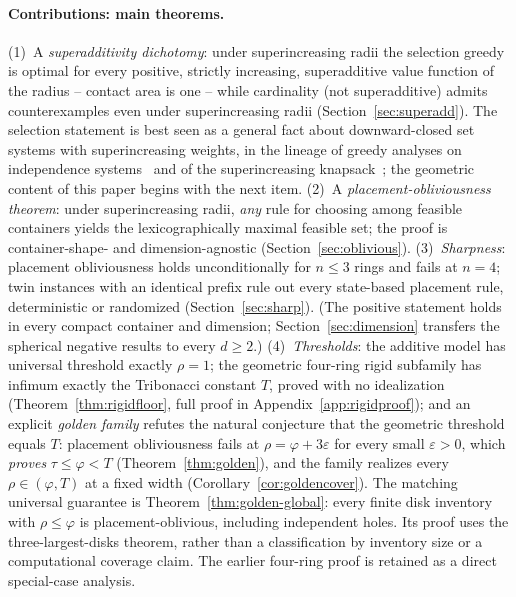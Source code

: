 \documentclass[11pt]{article}
\theoremstyle{definition}
\begin{document}
\paragraph{Contributions: main theorems.}
(1)~A \emph{superadditivity dichotomy}: under superincreasing radii the
selection greedy is optimal for every positive, strictly increasing,
superadditive value function of the radius -- contact area is one -- while
cardinality (not superadditive) admits counterexamples even under
superincreasing radii (Section~\ref{sec:superadd}). The selection statement
is best seen as a general fact about downward-closed set systems with
superincreasing weights, in the lineage of greedy analyses on independence
systems~\cite{Edmonds1971,KorteHausmann1978} and of the superincreasing
knapsack~\cite{Gupte2016}; the geometric content of this paper begins with
the next item.
(2)~A \emph{placement-obliviousness theorem}: under superincreasing radii,
\emph{any} rule for choosing among feasible containers yields the
lexicographically maximal feasible set; the proof is container-shape- and
dimension-agnostic (Section~\ref{sec:oblivious}).
(3)~\emph{Sharpness}: placement obliviousness holds unconditionally for
$n\le3$ rings and fails at $n=4$; twin instances with an identical prefix rule
out every state-based placement rule, deterministic or randomized
(Section~\ref{sec:sharp}).
(The positive statement holds in every compact container and dimension;
Section~\ref{sec:dimension} transfers the spherical negative results
to every $d\ge2$.)
(4)~\emph{Thresholds}: the additive model has universal threshold exactly
$\rho=1$; the geometric four-ring rigid subfamily has infimum exactly the
Tribonacci constant $T$, proved with no idealization
(Theorem~\ref{thm:rigidfloor}, full proof in
Appendix~\ref{app:rigidproof}); and an explicit \emph{golden family}
refutes the natural conjecture that the geometric threshold equals $T$:
placement obliviousness fails at $\rho=\varphi+3\varepsilon$ for every
small $\varepsilon>0$, which \emph{proves} $\tau\le\varphi<T$
(Theorem~\ref{thm:golden}), and the family realizes every
$\rho\in(\varphi,T)$ at a fixed width
(Corollary~\ref{cor:goldencover}). The matching universal guarantee
is Theorem~\ref{thm:golden-global}: every finite disk inventory with
$\rho\le\varphi$ is placement-oblivious, including independent holes.
Its proof uses the three-largest-disks theorem, rather than a
classification by inventory size or a computational coverage claim.
The earlier four-ring proof is retained as a direct special-case analysis.
\end{document}
